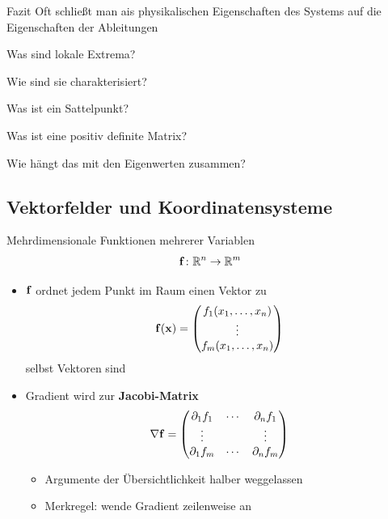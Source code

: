 \begin{frame}
  \begin{block}{Fazit}
    Oft schließt man ais physikalischen Eigenschaften des Systems auf
    die Eigenschaften der Ableitungen
  \end{block}
\end{frame}

\begin{Abschluss}
\item Was sind lokale Extrema?
\item Wie sind sie charakterisiert?
\item Was ist ein Sattelpunkt?
\item Was ist eine positiv definite Matrix?
\item Wie hängt das mit den Eigenwerten zusammen?
\end{Abschluss}

\subsection{Vektorfelder und Koordinatensysteme}

\begin{frame}{Mehrdimensionale Funktionen mehrerer Variablen}
  \begin{gather*}
    \mathbf{f}\colon \mathbb R^n \to \mathbb R^m
  \end{gather*}
  \begin{itemize}
  \item $\mathbf{f}$ ordnet jedem Punkt im Raum einen Vektor zu
    \begin{gather*}
      \mathbf{f}(\mathbf{x}) =
      \begin{pmatrix}
        f_1(x_1,\dots,x_n)\\
        \vdots\\
        f_m(x_1,\dots,x_n)
      \end{pmatrix}
    \end{gather*}
    selbst Vektoren sind
  \item Gradient wird zur \textbf{Jacobi-Matrix}
    \begin{gather*}
      \nabla \mathbf{f} =
      \begin{pmatrix}
        \partial_1 f_1 & \cdots & \partial_n f_1\\
        \vdots && \vdots \\
        \partial_1 f_m & \cdots & \partial_n f_m        
      \end{pmatrix}
    \end{gather*}
    \begin{itemize}
    \item Argumente der Übersichtlichkeit halber weggelassen
    \item Merkregel: wende Gradient zeilenweise an
    \end{itemize}
  \end{itemize}
\end{frame}

